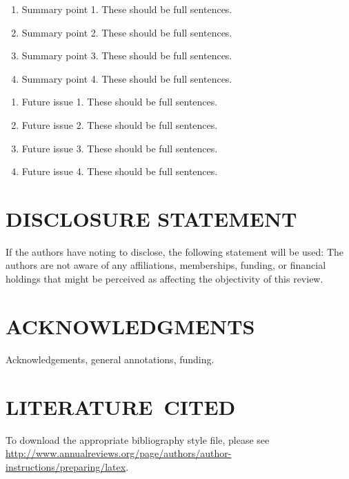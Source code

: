 \documentclass{ar-1col}
\begin{document}
\begin{summary}
\begin{enumerate}
\item Summary point 1. These should be full sentences.
\item Summary point 2. These should be full sentences.
\item Summary point 3. These should be full sentences.
\item Summary point 4. These should be full sentences.
\end{enumerate}
\end{summary}

\begin{issues}
\begin{enumerate}
\item Future issue 1. These should be full sentences.
\item Future issue 2. These should be full sentences.
\item Future issue 3. These should be full sentences.
\item Future issue 4. These should be full sentences.
\end{enumerate}
\end{issues}

\section*{DISCLOSURE STATEMENT}
If the authors have noting to disclose, the following statement will be used: The authors are not aware of any affiliations, memberships, funding, or financial holdings that
might be perceived as affecting the objectivity of this review. 

\section*{ACKNOWLEDGMENTS}
Acknowledgements, general annotations, funding.

%
\section*{LITERATURE\ CITED}

To download the appropriate bibliography style file, please see \url{http://www.annualreviews.org/page/authors/author-instructions/preparing/latex}. 

\\
\end{document}
